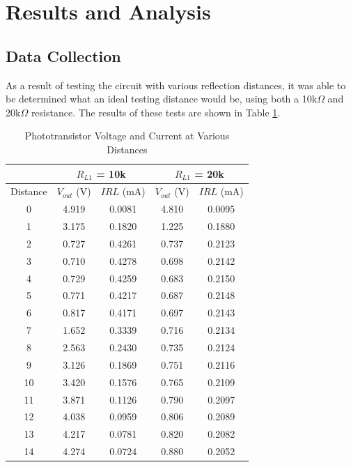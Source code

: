 \documentclass[conference]{IEEEtran}
\begin{document}
\section{Results and Analysis}

\subsection{Data Collection}

As a result of testing the circuit with various reflection distances, it was able to be
determined what an ideal testing distance would be, using both a 10k$\Omega$ and 20k$\Omega$ resistance. 
The results of these tests are shown in Table \ref{distanceVoltageCurrent}.

\begin{table}[H]
    \centering
    \caption{Phototransistor Voltage and Current at Various Distances}
    \label{distanceVoltageCurrent}
    \begin{tabular}{|c||c|c||c|c|}
        \hline
         & \multicolumn{2}{c||}{$R_{L1}$ = \textbf{10k}} & \multicolumn{2}{c|}{$R_{L1}$ = \textbf{20k}} \\
        \hline
        Distance & $V_{out}$ (V) & $IRL$ (mA) & $V_{out}$ (V) & $IRL$ (mA) \\
        \hline
        0 &  4.919 &  0.0081 & 4.810 & 0.0095 \\
        1 &  3.175 &  0.1820 & 1.225 & 0.1880 \\
        2 &  0.727 &  0.4261 & 0.737 & 0.2123 \\
        3 &  0.710 &  0.4278 & 0.698 & 0.2142 \\
        4 &  0.729 &  0.4259 & 0.683 & 0.2150 \\
        5 &  0.771 &  0.4217 & 0.687 & 0.2148 \\
        6 &  0.817 &  0.4171 & 0.697 & 0.2143 \\
        7 &  1.652 &  0.3339 & 0.716 & 0.2134 \\
        8 &  2.563 &  0.2430 & 0.735 & 0.2124 \\
        9 &  3.126 &  0.1869 & 0.751 & 0.2116 \\
        10 & 3.420 &  0.1576 & 0.765 & 0.2109 \\
        11 & 3.871 &  0.1126 & 0.790 & 0.2097 \\
        12 & 4.038 &  0.0959 & 0.806 & 0.2089 \\
        13 & 4.217 &  0.0781 & 0.820 & 0.2082 \\
        14 & 4.274 &  0.0724 & 0.880 & 0.2052 \\

\end{tabular}
\end{table}
\end{document}
